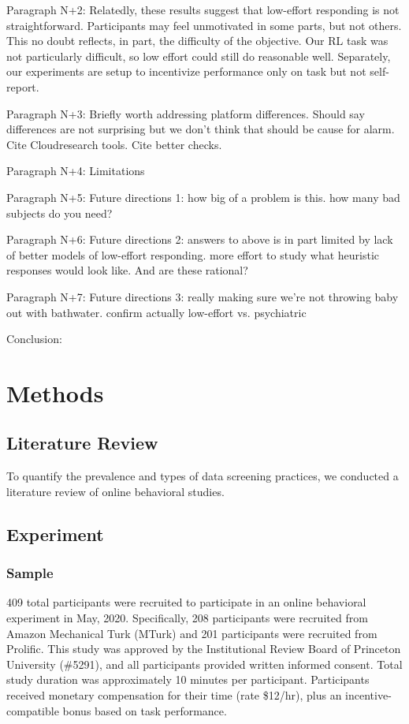 \documentclass[a4paper,notitlepage,12pt]{article}
\begin{document}
Paragraph N+2: Relatedly, these results suggest that low-effort responding is not straightforward. Participants may feel unmotivated in some parts, but not others. This no doubt reflects, in part, the difficulty of the objective. Our RL task was not particularly difficult, so low effort could still do reasonable well. Separately, our experiments are setup to incentivize performance only on task but not self-report. 

Paragraph N+3: Briefly worth addressing platform differences. Should say differences are not surprising but we don't think that should be cause for alarm. Cite Cloudresearch tools. Cite better checks. 

Paragraph N+4: Limitations

Paragraph N+5: Future directions 1: how big of a problem is this. how many bad subjects do you need?

Paragraph N+6: Future directions 2: answers to above is in part limited by lack of better models of low-effort responding. more effort to study what heuristic responses would look like. And are these rational? 

Paragraph N+7: Future directions 3: really making sure we're not throwing baby out with bathwater. confirm actually low-effort vs. psychiatric

Conclusion: 

\section{Methods}

\subsection{Literature Review}

To quantify the prevalence and types of data screening practices, we conducted a literature review of online behavioral studies.

\subsection{Experiment}

\subsubsection{Sample}

409 total participants were recruited to participate in an online behavioral experiment in May, 2020. Specifically, 208 participants were recruited from Amazon Mechanical Turk (MTurk) and 201 participants were recruited from Prolific.  This study was approved by the Institutional Review Board of Princeton University (\#5291), and all participants provided written informed consent. Total study duration was approximately 10 minutes per participant. Participants received monetary compensation for their time (rate \$12/hr), plus an incentive-compatible bonus based on task performance. 
\end{document}
